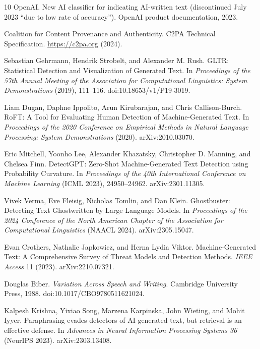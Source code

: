 \documentclass[sigconf,nonacm]{acmart}
\begin{document}
\begin{thebibliography}{10}
OpenAI.
\newblock New AI classifier for indicating AI-written text (discontinued July 2023 ``due to low rate of accuracy'').
\newblock OpenAI product documentation, 2023.

Coalition for Content Provenance and Authenticity.
\newblock C2PA Technical Specification.
\newblock \url{https://c2pa.org} (2024).

Sebastian Gehrmann, Hendrik Strobelt, and Alexander M. Rush.
\newblock GLTR: Statistical Detection and Visualization of Generated Text.
\newblock In \emph{Proceedings of the 57th Annual Meeting of the Association for Computational Linguistics: System Demonstrations} (2019), 111--116. doi:10.18653/v1/P19-3019.

Liam Dugan, Daphne Ippolito, Arun Kirubarajan, and Chris Callison-Burch.
\newblock RoFT: A Tool for Evaluating Human Detection of Machine-Generated Text.
\newblock In \emph{Proceedings of the 2020 Conference on Empirical Methods in Natural Language Processing: System Demonstrations} (2020). arXiv:2010.03070.

Eric Mitchell, Yoonho Lee, Alexander Khazatsky, Christopher D. Manning, and Chelsea Finn.
\newblock DetectGPT: Zero-Shot Machine-Generated Text Detection using Probability Curvature.
\newblock In \emph{Proceedings of the 40th International Conference on Machine Learning} (ICML 2023), 24950--24962. arXiv:2301.11305.

Vivek Verma, Eve Fleisig, Nicholas Tomlin, and Dan Klein.
\newblock Ghostbuster: Detecting Text Ghostwritten by Large Language Models.
\newblock In \emph{Proceedings of the 2024 Conference of the North American Chapter of the Association for Computational Linguistics} (NAACL 2024). arXiv:2305.15047.

Evan Crothers, Nathalie Japkowicz, and Herna Lydia Viktor.
\newblock Machine-Generated Text: A Comprehensive Survey of Threat Models and Detection Methods.
\newblock \emph{IEEE Access} 11 (2023). arXiv:2210.07321.

Douglas Biber.
\newblock \emph{Variation Across Speech and Writing}.
\newblock Cambridge University Press, 1988. doi:10.1017/CBO9780511621024.

Kalpesh Krishna, Yixiao Song, Marzena Karpinska, John Wieting, and Mohit Iyyer.
\newblock Paraphrasing evades detectors of AI-generated text, but retrieval is an effective defense.
\newblock In \emph{Advances in Neural Information Processing Systems 36} (NeurIPS 2023). arXiv:2303.13408.


\end{thebibliography}
\end{document}
